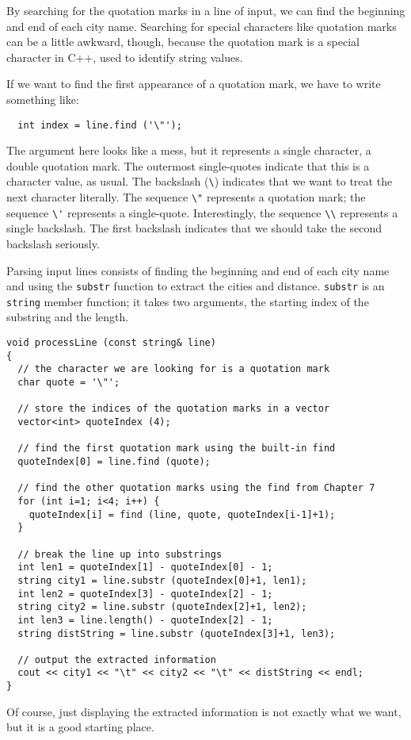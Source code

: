 By searching for the quotation marks in a line of input, we
can find the beginning and end of each city name.
Searching for special characters like quotation marks can be a little
awkward, though, because the quotation mark is a special character
in C++, used to identify string values.

If we want to find the
first appearance of a quotation mark, we have to write something
like:

\begin{verbatim}
  int index = line.find ('\"');
\end{verbatim}
%
The argument here looks like a mess, but it represents a single
character, a double quotation mark.  The outermost single-quotes
indicate that this is a character value, as usual.  The backslash
(\verb+\+) indicates that we want to treat the next character
literally.  The sequence \verb+\"+ represents a quotation mark; the
sequence \verb+\'+ represents a single-quote.  Interestingly, the
sequence \verb+\\+ represents a single backslash.  The first backslash
indicates that we should take the second backslash seriously.


Parsing input lines consists of finding the beginning and
end of each city name and using
the {\tt substr} function to extract the cities and distance.
{\tt substr} is an {\tt string} member function;
it takes two arguments, the starting index of the substring
and the length.


\begin{verbatim}
void processLine (const string& line)
{
  // the character we are looking for is a quotation mark
  char quote = '\"';

  // store the indices of the quotation marks in a vector
  vector<int> quoteIndex (4);

  // find the first quotation mark using the built-in find
  quoteIndex[0] = line.find (quote);

  // find the other quotation marks using the find from Chapter 7
  for (int i=1; i<4; i++) {
    quoteIndex[i] = find (line, quote, quoteIndex[i-1]+1);
  }

  // break the line up into substrings
  int len1 = quoteIndex[1] - quoteIndex[0] - 1;
  string city1 = line.substr (quoteIndex[0]+1, len1);
  int len2 = quoteIndex[3] - quoteIndex[2] - 1;
  string city2 = line.substr (quoteIndex[2]+1, len2);
  int len3 = line.length() - quoteIndex[2] - 1;
  string distString = line.substr (quoteIndex[3]+1, len3);

  // output the extracted information
  cout << city1 << "\t" << city2 << "\t" << distString << endl;
}
\end{verbatim}
%
Of course, just displaying the extracted information is not
exactly what we want, but it is a good starting place.

